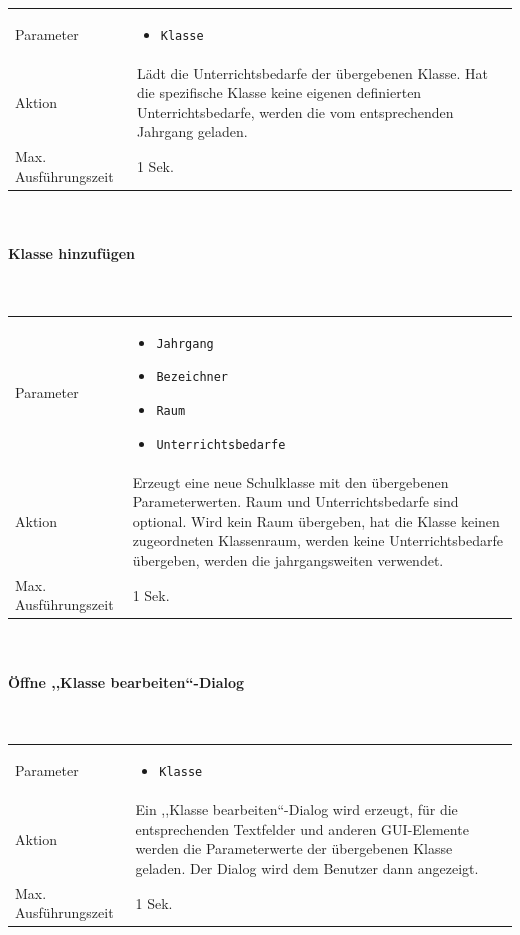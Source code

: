 \documentclass[fontsize=12pt,paper=a4,twoside]{scrartcl}
\begin{document}
\begin{tabularx}{\textwidth}{p{4cm}X}
Parameter & \begin{itemize}[itemsep=0pt, leftmargin = 0.5cm]
			\item \texttt{Klasse}
			\end{itemize}\\
Aktion & Lädt die Unterrichtsbedarfe der übergebenen Klasse. Hat die spezifische Klasse keine eigenen definierten Unterrichtsbedarfe, werden die vom entsprechenden Jahrgang geladen.\\
Max. Ausführungszeit & 1 Sek. 
\end{tabularx}\\


\paragraph{Klasse hinzufügen}\mbox{}\\

\begin{tabularx}{\textwidth}{p{4cm}X}
Parameter & \begin{itemize}[itemsep=0pt, leftmargin = 0.5cm]
			\item \texttt{Jahrgang}
			\item \texttt{Bezeichner}
			\item \texttt{Raum}
			\item \texttt{Unterrichtsbedarfe}
			\end{itemize}\\
Aktion & Erzeugt eine neue Schulklasse mit den übergebenen Parameterwerten. Raum und Unterrichtsbedarfe sind optional. Wird kein Raum übergeben, hat die Klasse keinen zugeordneten Klassenraum, werden keine Unterrichtsbedarfe übergeben, werden die jahrgangsweiten verwendet.\\
Max. Ausführungszeit & 1 Sek. 
\end{tabularx}\\


\paragraph{Öffne ,,Klasse bearbeiten``-Dialog}\mbox{}\\

\begin{tabularx}{\textwidth}{p{4cm}X}
Parameter & \begin{itemize}[itemsep=0pt, leftmargin = 0.5cm]
			\item \texttt{Klasse}
			\end{itemize}\\
Aktion & Ein ,,Klasse bearbeiten``-Dialog wird erzeugt, für die entsprechenden Textfelder und anderen GUI-Elemente werden die Parameterwerte der übergebenen Klasse geladen. Der Dialog wird dem Benutzer dann angezeigt.\\
Max. Ausführungszeit & 1 Sek. 
\end{tabularx}\\
\end{document}
